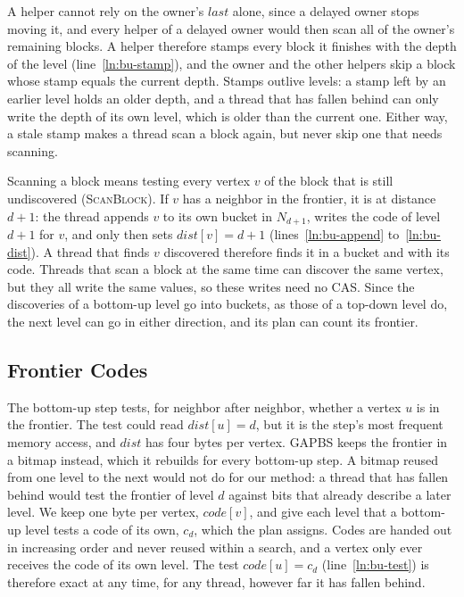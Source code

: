 A helper cannot rely on the owner's $\mathit{last}$ alone, since a delayed owner stops moving it, and every helper of a delayed owner would then scan all of the owner's remaining blocks. A helper therefore stamps every block it finishes with the depth of the level (line~\ref{ln:bu-stamp}), and the owner and the other helpers skip a block whose stamp equals the current depth. Stamps outlive levels: a stamp left by an earlier level holds an older depth, and a thread that has fallen behind can only write the depth of its own level, which is older than the current one. Either way, a stale stamp makes a thread scan a block again, but never skip one that needs scanning.

Scanning a block means testing every vertex $v$ of the block that is still undiscovered (\textsc{ScanBlock}). If $v$ has a neighbor in the frontier, it is at distance $d+1$: the thread appends $v$ to its own bucket in $N_{d+1}$, writes the code of level $d+1$ for $v$, and only then sets $\mathit{dist}[v] = d+1$ (lines~\ref{ln:bu-append} to~\ref{ln:bu-dist}). A thread that finds $v$ discovered therefore finds it in a bucket and with its code. Threads that scan a block at the same time can discover the same vertex, but they all write the same values, so these writes need no CAS. Since the discoveries of a bottom-up level go into buckets, as those of a top-down level do, the next level can go in either direction, and its plan can count its frontier.

\subsection{Frontier Codes}
\label{sec:do-codes}

The bottom-up step tests, for neighbor after neighbor, whether a vertex $u$ is in the frontier. The test could read $\mathit{dist}[u] = d$, but it is the step's most frequent memory access, and $\mathit{dist}$ has four bytes per vertex. GAPBS keeps the frontier in a bitmap instead, which it rebuilds for every bottom-up step. A bitmap reused from one level to the next would not do for our method: a thread that has fallen behind would test the frontier of level $d$ against bits that already describe a later level. We keep one byte per vertex, $\mathit{code}[v]$, and give each level that a bottom-up level tests a code of its own, $c_d$, which the plan assigns. Codes are handed out in increasing order and never reused within a search, and a vertex only ever receives the code of its own level. The test $\mathit{code}[u] = c_d$ (line~\ref{ln:bu-test}) is therefore exact at any time, for any thread, however far it has fallen behind.

